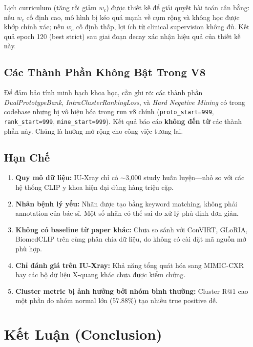 \documentclass[12pt, a4paper]{article}
\begin{document}
Lịch curriculum (tăng rồi giảm $w_c$) được thiết kế để giải quyết bài toán
cân bằng: nếu $w_c$ cố định cao, mô hình bị kéo quá mạnh về cụm rộng và
không học được khớp chính xác; nếu $w_c$ cố định thấp, lợi ích từ clinical
supervision không đủ. Kết quả epoch 120 (best strict) sau giai đoạn
decay xác nhận hiệu quả của thiết kế này.

\subsection{Các Thành Phần Không Bật Trong V8}

Để đảm bảo tính minh bạch khoa học, cần ghi rõ: các thành phần
\textit{DualPrototypeBank}, \textit{IntraClusterRankingLoss}, và
\textit{Hard Negative Mining} có trong codebase nhưng bị vô hiệu hóa trong
run v8 chính (\texttt{proto\_start=999}, \texttt{rank\_start=999},
\texttt{mine\_start=999}). Kết quả báo cáo \textbf{không đến từ} các thành
phần này. Chúng là hướng mở rộng cho công việc tương lai.

\subsection{Hạn Chế}

\begin{enumerate}
  \item \textbf{Quy mô dữ liệu:} IU-Xray chỉ có $\sim$3,000 study huấn
    luyện---nhỏ so với các hệ thống CLIP y khoa hiện đại dùng hàng triệu cặp.
  \item \textbf{Nhãn bệnh lý yếu:} Nhãn được tạo bằng keyword matching, không
    phải annotation của bác sĩ. Một số nhãn có thể sai do xử lý phủ định đơn
    giản.
  \item \textbf{Không có baseline từ paper khác:} Chưa so sánh với ConVIRT,
    GLoRIA, BiomedCLIP trên cùng phân chia dữ liệu, do không có cài đặt mã
    nguồn mở phù hợp.
  \item \textbf{Chỉ đánh giá trên IU-Xray:} Khả năng tổng quát hóa sang
    MIMIC-CXR hay các bộ dữ liệu X-quang khác chưa được kiểm chứng.
  \item \textbf{Cluster metric bị ảnh hưởng bởi nhóm bình thường:} Cluster
    R@1 cao một phần do nhóm normal lớn (57.88\%) tạo nhiều true positive
    dễ.
\end{enumerate}

\section{Kết Luận (Conclusion)}
\label{sec:conclusion}
\end{document}
